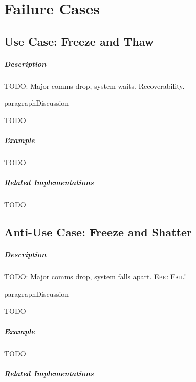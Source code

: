 \chapter{Failure Cases}

\section{Use Case: Freeze and Thaw}

\paragraph{Description}

{\Large TODO:} Major comms drop, system waits. Recoverability.

paragraph{Discussion}

{\Large TODO}

\paragraph{Example}

{\Large TODO}

\paragraph{Related Implementations}

{\Large TODO}

\section{Anti-Use Case: Freeze and Shatter}

\paragraph{Description}

{\Large TODO:} Major comms drop, system falls apart. \textsc{Epic Fail}!

paragraph{Discussion}

{\Large TODO}

\paragraph{Example}

{\Large TODO}

\paragraph{Related Implementations}


